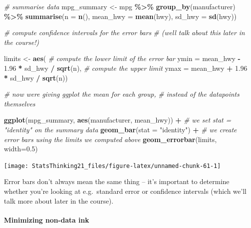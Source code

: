 \documentclass[
  12pt,
]{book}
\newenvironment{Shaded}{\begin{snugshade}}{\end{snugshade}}
\newcommand{\AttributeTok}[1]{\textcolor[rgb]{0.13,0.29,0.53}{#1}}
\newcommand{\CommentTok}[1]{\textcolor[rgb]{0.56,0.35,0.01}{\textit{#1}}}
\newcommand{\FloatTok}[1]{\textcolor[rgb]{0.00,0.00,0.81}{#1}}
\newcommand{\FunctionTok}[1]{\textcolor[rgb]{0.13,0.29,0.53}{\textbf{#1}}}
\newcommand{\NormalTok}[1]{#1}
\newcommand{\OtherTok}[1]{\textcolor[rgb]{0.56,0.35,0.01}{#1}}
\newcommand{\SpecialCharTok}[1]{\textcolor[rgb]{0.81,0.36,0.00}{\textbf{#1}}}
\newcommand{\StringTok}[1]{\textcolor[rgb]{0.31,0.60,0.02}{#1}}
\begin{document}
\begin{Shaded}
\begin{Highlighting}[]
\CommentTok{\# summarise data}
\NormalTok{mpg\_summary }\OtherTok{\textless{}{-}}\NormalTok{ mpg }\SpecialCharTok{\%\textgreater{}\%}
  \FunctionTok{group\_by}\NormalTok{(manufacturer) }\SpecialCharTok{\%\textgreater{}\%} 
  \FunctionTok{summarise}\NormalTok{(}\AttributeTok{n =} \FunctionTok{n}\NormalTok{(), }
            \AttributeTok{mean\_hwy =} \FunctionTok{mean}\NormalTok{(hwy), }
            \AttributeTok{sd\_hwy =} \FunctionTok{sd}\NormalTok{(hwy))}

\CommentTok{\# compute confidence intervals for the error bars}
\CommentTok{\# (we\textquotesingle{}ll talk about this later in the course!)}

\NormalTok{limits }\OtherTok{\textless{}{-}} \FunctionTok{aes}\NormalTok{(}
  \CommentTok{\# compute the lower limit of the error bar}
  \AttributeTok{ymin =}\NormalTok{ mean\_hwy }\SpecialCharTok{{-}} \FloatTok{1.96} \SpecialCharTok{*}\NormalTok{ sd\_hwy }\SpecialCharTok{/} \FunctionTok{sqrt}\NormalTok{(n), }
  \CommentTok{\# compute the upper limit}
  \AttributeTok{ymax =}\NormalTok{ mean\_hwy }\SpecialCharTok{+} \FloatTok{1.96} \SpecialCharTok{*}\NormalTok{ sd\_hwy }\SpecialCharTok{/} \FunctionTok{sqrt}\NormalTok{(n))}

\CommentTok{\# now we\textquotesingle{}re giving ggplot the mean for each group, }
\CommentTok{\# instead of the datapoints themselves}

\FunctionTok{ggplot}\NormalTok{(mpg\_summary, }\FunctionTok{aes}\NormalTok{(manufacturer, mean\_hwy)) }\SpecialCharTok{+}
  \CommentTok{\# we set stat = "identity" on the summary data }
  \FunctionTok{geom\_bar}\NormalTok{(}\AttributeTok{stat =} \StringTok{"identity"}\NormalTok{) }\SpecialCharTok{+} 
  \CommentTok{\# we create error bars using the limits we computed above}
  \FunctionTok{geom\_errorbar}\NormalTok{(limits, }\AttributeTok{width=}\FloatTok{0.5}\NormalTok{) }
\end{Highlighting}
\end{Shaded}

\texttt{[image: StatsThinking21\_files/figure-latex/unnamed-chunk-61-1]}

Error bars don't always mean the same thing -- it's important to determine whether you're looking at e.g.~standard error or confidence intervals (which we'll talk more about later in the course).

\hypertarget{minimizing-non-data-ink}{%
\paragraph{Minimizing non-data ink}\label{minimizing-non-data-ink}}
\end{document}
